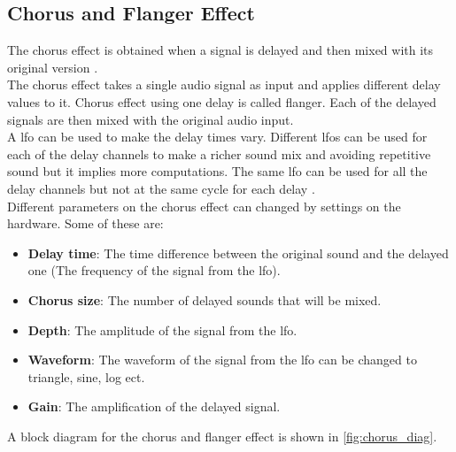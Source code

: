 \subsection{Chorus and Flanger Effect} \label{sec:chorus} 


The chorus effect is obtained when a signal is delayed and then mixed with its original version \citep{chorus_gibson} \citep{chorus_apple}. \\
The chorus effect takes a single audio signal as input and applies different delay values to it. Chorus effect using one delay is called flanger. Each of the delayed signals are then mixed with the original audio input. \\
A \gls{lfo} can be used to make the delay times vary. Different \gls{lfo}s can be used for each of the delay channels to make a richer sound mix and avoiding repetitive sound but it implies more computations. The same \gls{lfo} can be used for all the delay channels but not at the same cycle for each delay \citep{chorus_testtone}. \\ 

Different parameters on the chorus effect can changed by settings on the hardware. Some of these are:\\
\begin{itemize}
\item \textbf{Delay time}: The time difference between the original sound and the delayed one (The frequency of the signal from the \gls{lfo}).
\item \textbf{Chorus size}: The number of delayed sounds that will be mixed.
\item \textbf{Depth}: The amplitude of the signal from the \gls{lfo}.
\item \textbf{Waveform}: The waveform of the signal from the \gls{lfo} can be changed to triangle, sine, log ect. \citep{hobby_hour_chorus}
\item \textbf{Gain}: The amplification of the delayed signal.
\end{itemize} \citep{chorus_parameters}

A block diagram for  the chorus and flanger effect is shown in \autoref{fig:chorus_diag}.

